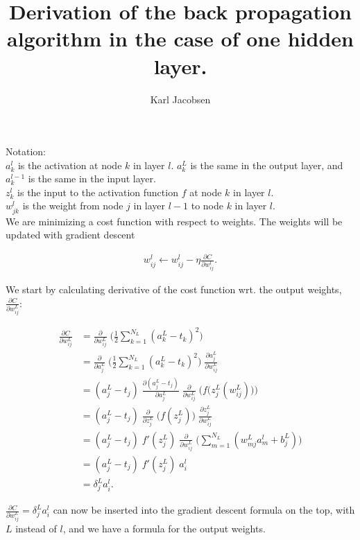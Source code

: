 \documentclass[a4paper, 12pt]{article}
\title{Derivation of the back propagation algorithm in the case of one hidden layer.}
\author{Karl Jacobsen}
\begin{document}
\maketitle
	
Notation: \\
$a_k^l$ is the activation at node $k$ in layer $l$. $a_k^L$ is the same in the output layer, and $a_k^{l-1}$ is the same in the input layer. \\
$z_k^l$ is the input to the activation function $f$ at node $k$ in layer $l$.\\
$w_{jk}^l$ is the weight from node $j$ in layer $l-1$ to node $k$ in layer $l$.\\

We are minimizing a cost function with respect to weights.
The weights will be updated with gradient descent

\begin{align}
	w_{ij}^l \leftarrow w_{ij}^l - \eta \frac{\partial{C}}{\partial{w_{ij}^l}}.
\end{align}

We start by calculating derivative of the cost function wrt. the output weights, $\frac{\partial C}{\partial w_{ij}^L}$:

\begin{align}
\frac{\partial C}{\partial w_{ij}^L} &= \frac{\partial}{\partial w_{ij}^L}\; \Big( \frac{1}{2} \sum_{k=1}^{N_L} (a_k^L - t_k)^2 \Big)\\
&=\frac{\partial}{\partial a_j^L}\; \Big( \frac{1}{2} \sum_{k=1}^{N_L} (a_k^L - t_k)^2 \Big)\;\frac{\partial a_j^L}{\partial w_{ij}^L}\\
&=(a_j^L - t_j) \; \frac{\partial (a_j^L - t_j)}{\partial a_j^L}\; \frac{\partial}{\partial w_{ij}^L}\; \Bigg(f\Big(z_j^L(w_{ij}^L) \Big)\Bigg)\\
&=(a_j^L - t_j) \;\frac{\partial}{\partial z_j^L} \;\Big(f(z_j^L) \Big)\; \frac{\partial z_j^L}{\partial w_{ij}^L}\\
&=(a_j^L - t_j) \; f'(z_j^L) \; \frac{\partial }{\partial w_{ij}^L}\;\Big(\sum_{m=1}^{N_L} (w_{mj}^L a_m^l + b_j^L) \Big)\\
&=(a_j^L - t_j) \; f'(z_j^L) \; a_i^l\\
&=\delta_j^L a_i^l.
\end{align}

$\frac{\partial C}{\partial w_{ij}^L}=\delta_j^L a_i^l$ can now be inserted into the gradient descent formula on the top, with $L$ instead of $l$, and we have a formula for the output weights. \\
\end{document}
